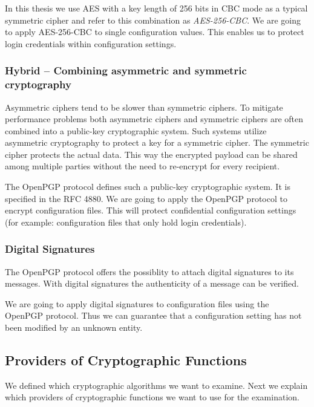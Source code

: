 In this thesis we use AES with a key length of 256 bits in CBC mode as a typical symmetric cipher and refer to this combination as \emph{AES-256-CBC}.
We are going to apply AES-256-CBC to single configuration values.
This enables us to protect login credentials within configuration settings.

\subsubsection{Hybrid -- Combining asymmetric and symmetric cryptography}

Asymmetric ciphers tend to be slower than symmetric ciphers.
To mitigate performance problems both asymmetric ciphers and symmetric ciphers are often combined into a public-key cryptographic system.
Such systems utilize asymmetric cryptography to protect a key for a symmetric cipher.
The symmetric cipher protects the actual data.
This way the encrypted payload can be shared among multiple parties without the need to re-encrypt for every recipient.\cite{stallings2014} 

The OpenPGP protocol defines such a public-key cryptographic system.
It is specified in the RFC 4880.\cite{rfc4880}
We are going to apply the OpenPGP protocol to encrypt configuration files.
This will protect confidential configuration settings (for example: configuration files that only hold login credentials).

\subsubsection{Digital Signatures}

The OpenPGP protocol offers the possiblity to attach digital signatures to its messages.\cite{rfc4880}
With digital signatures the authenticity of a message can be verified.\cite{bruceschneier1996,stallings2014}

We are going to apply digital signatures to configuration files using the OpenPGP protocol.
Thus we can guarantee that a configuration setting has not been modified by an unknown entity.

\subsection{Providers of Cryptographic Functions}

We defined which cryptographic algorithms we want to examine.
Next we explain which providers of cryptographic functions we want to use for the examination.

